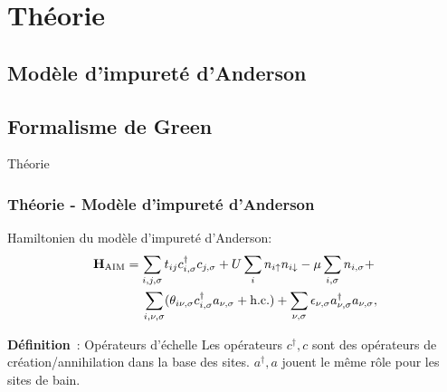 
\section{Théorie}

\subsection{Modèle d'impureté d'Anderson}

\subsection{Formalisme de Green}

\begin{frame}
    \vfill
    \begin{center}
        \large
        Théorie
    \end{center}
    \vfill
\end{frame}

\begin{frame}
    \frametitle{Théorie - Modèle d'impureté d'Anderson}
    Hamiltonien du modèle d'impureté d'Anderson\footnotemark:
    \begin{align}
        \vb{H}_{\text{AIM}} &= \sum_{i,j,\sigma}t_{ij}c_{i,\sigma}^\dagger c_{j,\sigma} + U\sum_in_{i\uparrow}n_{i\downarrow} - \mu\sum_{i,\sigma}n_{i,\sigma} + \nonumber\\
            &\hspace{0.45cm}\sum_{i,\nu,\sigma}(\theta_{i\nu,\sigma}c_{i,\sigma}^\dagger a_{\nu,\sigma} + \text{h.c.}) + \sum_{\nu,\sigma}\epsilon_{\nu,\sigma}a^\dagger_{\nu,\sigma}a_{\nu,\sigma},
        \label{eq: H_AIM}
    \end{align}
    \pause
    \begin{mybrownbox}{\textbf{Définition}~: Opérateurs d'échelle}
        Les opérateurs $c^\dagger, c$ sont des opérateurs de création/annihilation dans la base des
        sites. $a^\dagger, a$ jouent le même rôle pour les sites de bain.
    \end{mybrownbox}
\end{frame}

